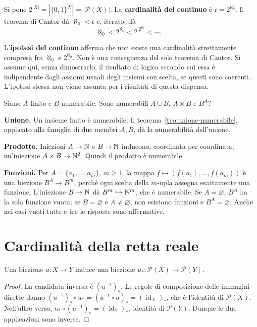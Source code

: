 \begin{definizione}
Si pone $2^{|X|}=|\{0,1\}^X|=|\mathcal P(X)|$. La \textbf{cardinalità del continuo} è $\mathfrak c=2^{\aleph_0}$. Il teorema di Cantor dà $\aleph_0<\mathfrak c$ e, iterato, dà
\[
\aleph_0<2^{\aleph_0}<2^{\,2^{\aleph_0}}<\cdots.
\]
\end{definizione}

\begin{osservazione}
L'\textbf{ipotesi del continuo} afferma che non esiste una cardinalità strettamente compresa fra $\aleph_0$ e $2^{\aleph_0}$. Non è una conseguenza del solo teorema di Cantor. Si assume qui, senza dimostrarlo, il risultato di logica secondo cui essa è indipendente dagli assiomi usuali degli insiemi con scelta, se questi sono coerenti. L'ipotesi stessa non viene assunta per i risultati di questa dispensa.
\end{osservazione}

\begin{esercizio}
Siano $A$ finito e $B$ numerabile. Sono numerabili $A\cup B$, $A\times B$ e $B^A$?
\end{esercizio}
\begin{svolgimento}
\textbf{Unione.} Un insieme finito è numerabile. Il teorema~\ref{teo:unione-numerabile}, applicato alla famiglia di due membri $A,B$, dà la numerabilità dell'unione.

\textbf{Prodotto.} Iniezioni $A\to\mathbb{N}$ e $B\to\mathbb{N}$ inducono, coordinata per coordinata, un'iniezione $A\times B\to\mathbb{N}^2$. Quindi il prodotto è numerabile.

\textbf{Funzioni.} Per $A=\{a_1,\ldots,a_m\}$, $m\ge1$, la mappa $f\mapsto(f(a_1),\ldots,f(a_m))$ è una biezione $B^A\to B^m$, perché ogni scelta della $m$-upla assegna esattamente una funzione. L'iniezione $B\to\mathbb{N}$ dà $B^m\hookrightarrow\mathbb{N}^m$, che è numerabile. Se $A=\varnothing$, $B^A$ ha la sola funzione vuota; se $B=\varnothing$ e $A\ne\varnothing$, non esistono funzioni e $B^A=\varnothing$. Anche nei casi vuoti tutte e tre le risposte sono affermative.
\end{svolgimento}

\section{Cardinalità della retta reale}
\begin{proposizione}
Una biezione $u:X\to Y$ induce una biezione $u_*:\mathcal P(X)\to\mathcal P(Y)$.
\end{proposizione}
\begin{proof}
La candidata inversa è $(u^{-1})_*$. Le regole di composizione delle immagini dirette danno $(u^{-1})_*\circ u_*=(u^{-1}\circ u)_*=(\operatorname{id}_X)_*$, che è l'identità di $\mathcal P(X)$. Nell'altro verso, $u_*\circ(u^{-1})_*=(\operatorname{id}_Y)_*$, identità di $\mathcal P(Y)$. Dunque le due applicazioni sono inverse.
\end{proof}

